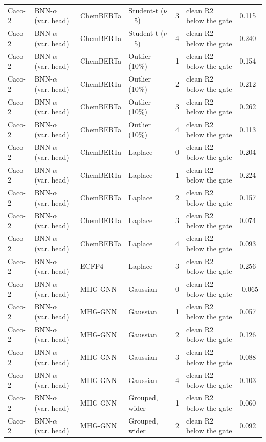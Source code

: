 {\begin{longtable}{llllcll}
Caco-2 & BNN-$\alpha$ (var. head) & ChemBERTa & Student-t ($\nu$=5) & 3 & clean R2 below the gate & 0.115 \\
Caco-2 & BNN-$\alpha$ (var. head) & ChemBERTa & Student-t ($\nu$=5) & 4 & clean R2 below the gate & 0.240 \\
Caco-2 & BNN-$\alpha$ (var. head) & ChemBERTa & Outlier (10\%) & 1 & clean R2 below the gate & 0.154 \\
Caco-2 & BNN-$\alpha$ (var. head) & ChemBERTa & Outlier (10\%) & 2 & clean R2 below the gate & 0.212 \\
Caco-2 & BNN-$\alpha$ (var. head) & ChemBERTa & Outlier (10\%) & 3 & clean R2 below the gate & 0.262 \\
Caco-2 & BNN-$\alpha$ (var. head) & ChemBERTa & Outlier (10\%) & 4 & clean R2 below the gate & 0.113 \\
Caco-2 & BNN-$\alpha$ (var. head) & ChemBERTa & Laplace & 0 & clean R2 below the gate & 0.204 \\
Caco-2 & BNN-$\alpha$ (var. head) & ChemBERTa & Laplace & 1 & clean R2 below the gate & 0.224 \\
Caco-2 & BNN-$\alpha$ (var. head) & ChemBERTa & Laplace & 2 & clean R2 below the gate & 0.157 \\
Caco-2 & BNN-$\alpha$ (var. head) & ChemBERTa & Laplace & 3 & clean R2 below the gate & 0.074 \\
Caco-2 & BNN-$\alpha$ (var. head) & ChemBERTa & Laplace & 4 & clean R2 below the gate & 0.093 \\
Caco-2 & BNN-$\alpha$ (var. head) & ECFP4 & Laplace & 3 & clean R2 below the gate & 0.256 \\
Caco-2 & BNN-$\alpha$ (var. head) & MHG-GNN & Gaussian & 0 & clean R2 below the gate & -0.065 \\
Caco-2 & BNN-$\alpha$ (var. head) & MHG-GNN & Gaussian & 1 & clean R2 below the gate & 0.057 \\
Caco-2 & BNN-$\alpha$ (var. head) & MHG-GNN & Gaussian & 2 & clean R2 below the gate & 0.126 \\
Caco-2 & BNN-$\alpha$ (var. head) & MHG-GNN & Gaussian & 3 & clean R2 below the gate & 0.088 \\
Caco-2 & BNN-$\alpha$ (var. head) & MHG-GNN & Gaussian & 4 & clean R2 below the gate & 0.103 \\
Caco-2 & BNN-$\alpha$ (var. head) & MHG-GNN & Grouped, wider & 1 & clean R2 below the gate & 0.060 \\
Caco-2 & BNN-$\alpha$ (var. head) & MHG-GNN & Grouped, wider & 2 & clean R2 below the gate & 0.092 \\

\end{longtable}}
